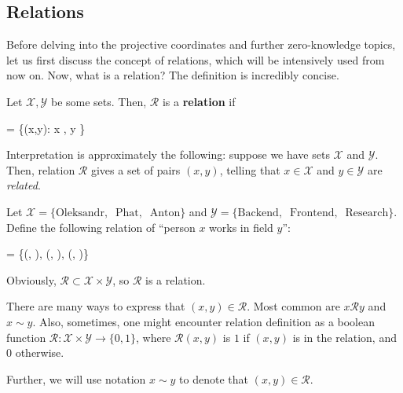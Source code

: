 \documentclass[../../book.tex]{subfiles}
\begin{document}
\subsection{Relations}\label{section:relations}

Before delving into the projective coordinates and further zero-knowledge topics, let us first discuss the concept of relations, which will be intensively used from now on. Now, what is a relation? The definition is incredibly concise.

\begin{definition}
    Let $\mathcal{X},\mathcal{Y}$ be some sets. Then, $\mathcal{R}$ is a \textbf{relation} if 
    \begin{xequation}
         \subset {} \times {} = \{(x,y): x \in {}, y \in {}\}
    \end{xequation}
\end{definition}

Interpretation is approximately the following: suppose we have sets $\mathcal{X}$ and $\mathcal{Y}$. Then, relation $\mathcal{R}$ gives a set of pairs $(x,y)$, telling that $x \in \mathcal{X}$ and $y \in \mathcal{Y}$ are \textit{related}.

\begin{example}
    Let $\mathcal{X} = \{\text{Oleksandr}, \;\; \text{Phat}, \;\; \text{Anton}\}$ and $\mathcal{Y} = \{\text{Backend}, \;\; \text{Frontend}, \;\; \text{Research}\}$. Define the following relation of ``person $x$ works in field $y$'':
    \begin{xequation*}
         = \{(, \;\; ), \;\; (, \;\; ), (, \;\; )\}
    \end{xequation*}
    Obviously, $\mathcal{R} \subset \mathcal{X} \times \mathcal{Y}$, so $\mathcal{R}$ is a relation.
\end{example}

\begin{remark}
    There are many ways to express that $(x,y) \in \mathcal{R}$. Most common are $x \mathcal{R} y$ and $x \sim y$. Also, sometimes, one might encounter relation definition as a boolean function $\mathcal{R}: \mathcal{X} \times \mathcal{Y} \to \{0,1\}$, where $\mathcal{R}(x,y)$ is $1$ if $(x,y)$ is in the relation, and $0$ otherwise.

    Further, we will use notation $x \sim y$ to denote that $(x,y) \in \mathcal{R}$.
\end{remark}
\end{document}
